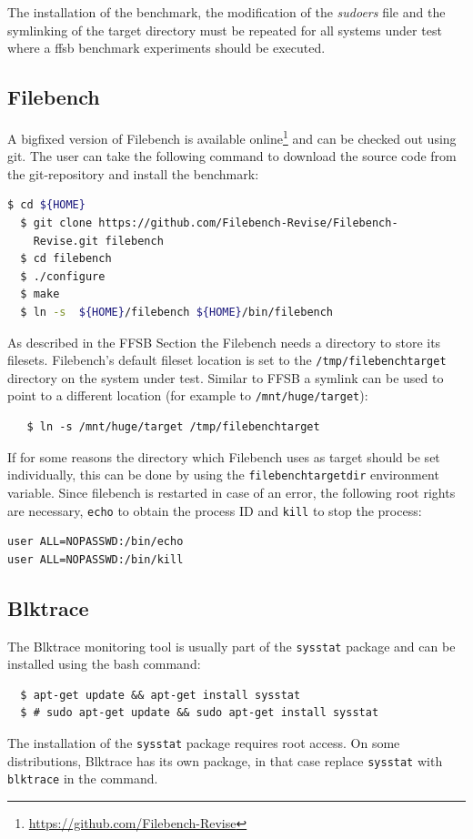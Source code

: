 The installation of the benchmark, the modification of the \textit{sudoers}
file and the symlinking of the target directory must be repeated for all systems
under test where a ffsb benchmark experiments should be executed.

\subsection{Filebench}
A bigfixed version of Filebench is available online\footnote{\url{https://github.com/Filebench-Revise}} and can be checked out using git. The user can take the following command 
to download the source code from the git-repository and install the benchmark:
\begin{lstlisting}[language=bash]
  $ cd ${HOME}
  $ git clone https://github.com/Filebench-Revise/Filebench-
    Revise.git filebench
  $ cd filebench
  $ ./configure
  $ make
  $ ln -s  ${HOME}/filebench ${HOME}/bin/filebench
\end{lstlisting}

As described in the FFSB Section the Filebench needs a directory to store its filesets. Filebench's default fileset location is
set to the \texttt{/tmp/filebenchtarget} directory on the system under test. Similar to FFSB a symlink can be used to point to a
different location (for example to \texttt{/mnt/huge/target}):
\begin{lstlisting}
   $ ln -s /mnt/huge/target /tmp/filebenchtarget
\end{lstlisting}
If for some reasons the directory which Filebench uses as target should be set
individually, this can be done by using the \texttt{filebenchtargetdir} environment
variable. Since filebench is restarted in case of an error, the following root rights are necessary, \texttt{echo} to obtain the process ID and \texttt{kill} to stop the process: 
\begin{lstlisting}
user ALL=NOPASSWD:/bin/echo
user ALL=NOPASSWD:/bin/kill
\end{lstlisting}

\subsection{Blktrace}
The Blktrace monitoring tool is usually part of the \texttt{sysstat} package and can be installed using the bash command:
\begin{lstlisting}
  $ apt-get update && apt-get install sysstat
  $ # sudo apt-get update && sudo apt-get install sysstat
\end{lstlisting}
The installation of the \texttt{sysstat} package requires root access. On some distributions, Blktrace has its own package, in that case replace \texttt{sysstat} with \texttt{blktrace} in the command.
  
